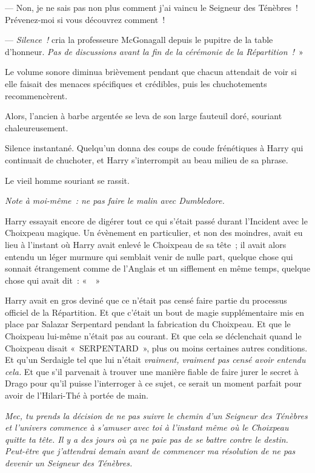 --- Non, je ne sais pas non plus comment j'ai vaincu le Seigneur des Ténèbres~! Prévenez-moi si vous découvrez comment~!

--- \emph{Silence~!} cria la professeure McGonagall depuis le pupitre de la table d'honneur.
\emph{Pas de discussions avant la fin de la cérémonie de la Répartition~!}~»

Le volume sonore diminua brièvement pendant que chacun attendait de voir si elle faisait des menaces spécifiques et crédibles, puis les chuchotements recommencèrent.

Alors, l'ancien à barbe argentée se leva de son large fauteuil doré, souriant chaleureusement.

Silence instantané.
Quelqu'un donna des coups de coude frénétiques à Harry qui continuait de chuchoter, et Harry s'interrompit au beau milieu de sa phrase.

Le vieil homme souriant se rassit.

\emph{Note à moi-même~: ne pas faire le malin avec Dumbledore.}

Harry essayait encore de digérer tout ce qui s'était passé durant l'Incident avec le Choixpeau magique.
Un évènement en particulier, et non des moindres, avait eu lieu à l'instant où Harry avait enlevé le Choixpeau de sa tête~;
il avait alors entendu un léger murmure qui semblait venir de nulle part, quelque chose qui sonnait étrangement comme de l'Anglais et un sifflement en même temps, quelque chose qui avait dit~:
«~~»

Harry avait en gros deviné que ce n'était pas censé faire partie du processus officiel de la Répartition.
Et que c'était un bout de magie supplémentaire mis en place par Salazar Serpentard pendant la fabrication du Choixpeau.
Et que le Choixpeau lui-même n'était pas au courant.
Et que cela se déclenchait quand le Choixpeau disait «~SERPENTARD~», plus ou moins certaines autres conditions.
Et qu'un Serdaigle tel que lui n'était \emph{vraiment, vraiment pas censé avoir entendu cela.}
Et que s'il parvenait à trouver une manière fiable de faire jurer le secret à Drago pour qu'il puisse l'interroger à ce sujet, ce serait un moment parfait pour avoir de l'Hilari-Thé à portée de main.

\emph{Mec, tu prends la décision de ne pas suivre le chemin d'un Seigneur des Ténèbres et l'univers commence à s'amuser avec toi à l'instant même où le Choixpeau quitte ta tête.
Il y a des jours où ça ne paie pas de se battre contre le destin.
Peut-être que j'attendrai demain avant de commencer ma résolution de ne pas devenir un Seigneur des Ténèbres.}

